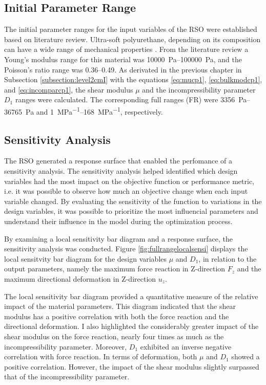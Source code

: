 \subsection*{Initial Parameter Range}
The initial parameter ranges for the input variables of the RSO were established based on literature review.
Ultra-soft polyurethane, depending on its composition can have a wide range of mechanical properties \cite{Wendels2021}.
From the literature review a Young's modulus range for this material was \SIrange{10000}{100000}{\pascal}, and the 
Poisson's ratio range was \SIrange{0.36}{0.49}{}. As derivated in the previous chapter in 
Subsection \ref{subsection:level2cmI} with the equations \ref{eq:mucp1}, \ref{eq:bulkmodcp1}, 
and \ref{eq:incomparcp1}, the shear modulus $\mu$ and the incompressibility parameter $D_1$ ranges were calculated.
The corresponding full ranges (FR) were \SIrange{3356}{36765}{\pascal} and \SIrange{1}{168}{\mega\pascal\tothe{-1}}, respectively.

\subsection*{Sensitivity Analysis}
The RSO generated a response surface that enabled the perfomance of a sensitivity analysis.
The sensitivity analysis helped identified which design variables had the most impact 
on the objective function or performance metric, i.e. it was possible to observe how much 
an objective change when each input variable changed. By evaluating the sensitivity of the 
function to variations in the design variables, it was possible to prioritize the most 
influencial parameters and understand their influence in the model during the optimization 
process.

By examining a local sensitivity bar diagram and a response surface, the sensitivity analysis was conducted.
Figure \ref{fig:fullrangelocalsensi} displays the local sensitvity bar diagram for the design variables
$\mu$ and $D_1$, in relation to the output parameters, namely the maximum force reaction in Z-direction $F_z$ 
and the maximum directional deformation in Z-direction $u_z$. 

The local sensitivity bar diagram provided a quantitative measure of the relative impact of the material 
parameters. This diagram indicated that the shear modulus has a positive correlation with both the force
reaction and the directional deformation. I also highlighted the considerably greater impact of the shear modulus 
on the force reaction, nearly four times as much as the incompressibility parameter. Moreover, $D_1$ exhibited 
an inverse negative correlation with force reaction.
In terms of deformation, both $\mu$ and $D_1$ showed a positive correlation. However, the impact of the 
shear modulus slightly surpassed that of the incompressibility parameter.\\

